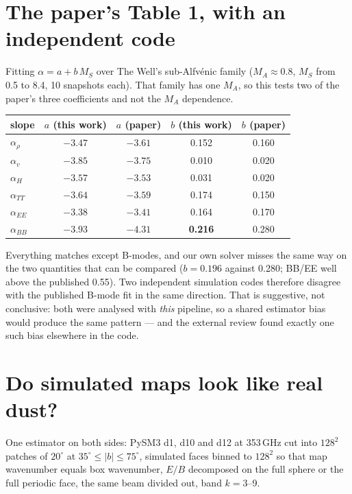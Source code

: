 \documentclass[10pt,a4paper]{article}
\begin{document}
\section{The paper's Table 1, with an independent code}

Fitting $\alpha=a+b\,M_S$ over The Well's sub-Alfvénic family ($M_A\approx0.8$,
$M_S$ from 0.5 to 8.4, 10 snapshots each). That family has one $M_A$, so this
tests two of the paper's three coefficients and not the $M_A$ dependence.

\begin{center}\small
\begin{tabular}{lcccc}
\toprule
slope & $a$ (this work) & $a$ (paper) & $b$ (this work) & $b$ (paper)\\
\midrule
$\alpha_\rho$  & $-3.47$ & $-3.61$ & 0.152 & 0.160\\
$\alpha_v$     & $-3.85$ & $-3.75$ & 0.010 & 0.020\\
$\alpha_H$     & $-3.57$ & $-3.53$ & 0.031 & 0.020\\
$\alpha_{TT}$  & $-3.64$ & $-3.59$ & 0.174 & 0.150\\
$\alpha_{EE}$  & $-3.38$ & $-3.41$ & 0.164 & 0.170\\
$\alpha_{BB}$  & $\mathbf{-3.93}$ & $-4.31$ & \textbf{0.216} & 0.280\\
\bottomrule
\end{tabular}
\end{center}

Everything matches except B-modes, and our own solver misses the same way on the
two quantities that can be compared ($b=0.196$ against 0.280; BB/EE well above
the published 0.55). Two independent simulation codes therefore disagree with the
published B-mode fit in the same direction. That is suggestive, not conclusive:
both were analysed with \emph{this} pipeline, so a shared estimator bias would
produce the same pattern --- and the external review found exactly one such bias
elsewhere in the code.

\section{Do simulated maps look like real dust?}

One estimator on both sides: PySM3 d1, d10 and d12 at 353\,GHz cut into
$128^2$ patches of $20^\circ$ at $35^\circ\le|b|\le75^\circ$, simulated faces
binned to $128^2$ so that map wavenumber equals box wavenumber, $E/B$ decomposed
on the full sphere or the full periodic face, the same beam divided out, band
$k=3$--9.
\end{document}
